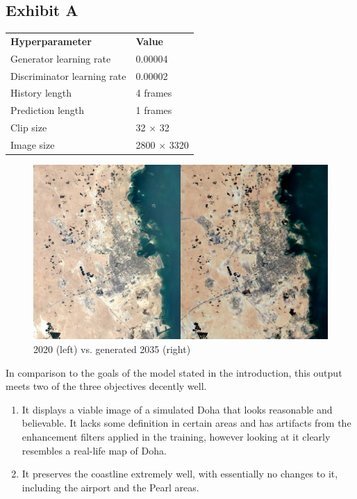 \documentclass{article}
\begin{document}
\subsection{Exhibit A}

\begin{table}[h]
\begin{tabular}{ll}
\textbf{Hyperparameter} & \textbf{Value}\\
Generator learning rate & 0.00004\\
Discriminator learning rate & 0.00002\\
History length & 4 frames\\
Prediction length & 1 frames\\
Clip size & 32 $\times$ 32\\
Image size & 2800 $\times$ 3320\\
\end{tabular}
\end{table}

\begin{figure}[H]
    \caption{2020 (left) vs. generated 2035 (right)}
    \centering
    \includegraphics[width=0.7\linewidth]{exhibit-a-comp.jpg}
\end{figure}

In comparison to the goals of the model stated in the introduction, this output meets two of the three objectives decently well.

\begin{enumerate}[label=(\alph*)]
    \item It displays a viable image of a simulated Doha that looks reasonable and believable. It lacks some definition in certain areas and has artifacts from the enhancement filters applied in the training, however looking at it clearly resembles a real-life map of Doha.
    \item It preserves the coastline extremely well, with essentially no changes to it, including the airport and the Pearl areas.
\end{enumerate}
\end{document}
